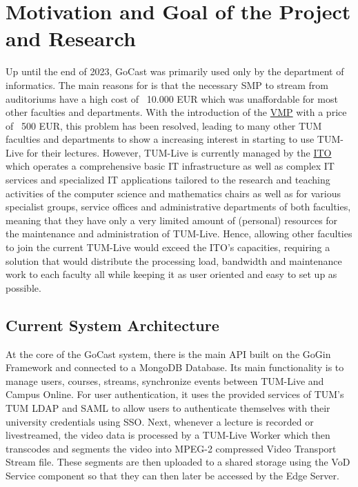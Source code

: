 \section{Motivation and Goal of the Project and Research}

Up until the end of 2023, GoCast was primarily used only by the department of informatics. The main reasons for is that the necessary \ac{SMP} to stream from auditoriums have a high cost of ~10.000 EUR which was unaffordable for most other faculties and departments.
With the introduction of the \href{https://github.com/TUM-Dev/VMP/}{\ac{VMP}} with a price of ~500 EUR, this problem has been resolved, leading to many other TUM faculties and departments to show a increasing interest in starting to use TUM-Live for their lectures. However, TUM-Live is currently managed by the \href{https://www.cit.tum.de/ito/die-ito/}{\ac{ITO}} which operates a comprehensive basic IT infrastructure as well as complex IT services and specialized IT applications tailored to the research and teaching activities of the computer science and mathematics chairs as well as for various specialist groups, service offices and administrative departments of both faculties, meaning that they have only a very limited amount of (personal) resources for the maintenance and administration of TUM-Live. Hence, allowing other faculties to join the current TUM-Live would exceed the \ac{ITO}'s capacities, requiring a solution that would distribute the processing load, bandwidth and maintenance work to each faculty all while keeping it as user oriented and easy to set up as possible.

\subsection{Current System Architecture}

At the core of the GoCast system, there is the main \ac{API} built on the GoGin Framework and connected to a MongoDB Database. Its main functionality is to manage users, courses, streams, synchronize events between TUM-Live and Campus Online. For user authentication, it uses the provided services of \ac{TUM}'s \ac{TUM} \ac{LDAP} and \ac{SAML} to allow users to authenticate themselves with their university credentials using \ac{SSO}. 
Next, whenever a lecture is recorded or livestreamed, the video data is processed by a TUM-Live Worker which then transcodes and segments the video into MPEG-2 compressed Video Transport Stream file. These segments are then uploaded to a shared storage using the VoD Service component so that they can then later be accessed by the Edge Server.

